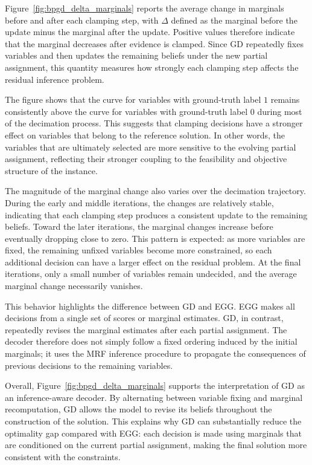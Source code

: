 

Figure~\ref{fig:bpgd_delta_marginals} reports the average change in marginals before and after each clamping step, with $\Delta$ defined as the marginal before the update minus the marginal after the update. Positive values therefore indicate that the marginal decreases after evidence is clamped. Since GD repeatedly fixes variables and then updates the remaining beliefs under the new partial assignment, this quantity measures how strongly each clamping step affects the residual inference problem.

The figure shows that the curve for variables with ground-truth label $1$ remains consistently above the curve for variables with ground-truth label $0$ during most of the decimation process. This suggests that clamping decisions have a stronger effect on variables that belong to the reference solution. In other words, the variables that are ultimately selected are more sensitive to the evolving partial assignment, reflecting their stronger coupling to the feasibility and objective structure of the instance.

The magnitude of the marginal change also varies over the decimation trajectory. During the early and middle iterations, the changes are relatively stable, indicating that each clamping step produces a consistent update to the remaining beliefs. Toward the later iterations, the marginal changes increase before eventually dropping close to zero. This pattern is expected: as more variables are fixed, the remaining unfixed variables become more constrained, so each additional decision can have a larger effect on the residual problem. At the final iterations, only a small number of variables remain undecided, and the average marginal change necessarily vanishes.

This behavior highlights the difference between GD and EGG. EGG makes all decisions from a single set of scores or marginal estimates. GD, in contrast, repeatedly revises the marginal estimates after each partial assignment. The decoder therefore does not simply follow a fixed ordering induced by the initial marginals; it uses the MRF inference procedure to propagate the consequences of previous decisions to the remaining variables.

Overall, Figure~\ref{fig:bpgd_delta_marginals} supports the interpretation of GD as an inference-aware decoder. By alternating between variable fixing and marginal recomputation, GD allows the model to revise its beliefs throughout the construction of the solution. This explains why GD can substantially reduce the optimality gap compared with EGG: each decision is made using marginals that are conditioned on the current partial assignment, making the final solution more consistent with the constraints.

